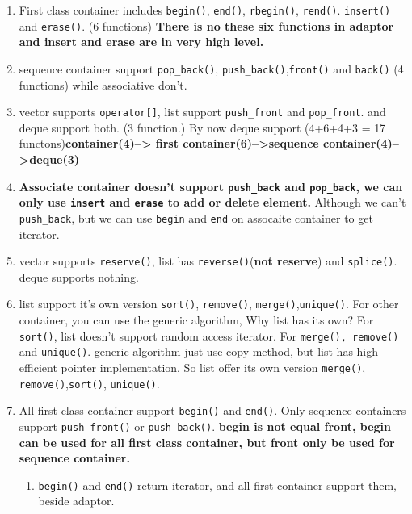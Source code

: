 \documentclass[a4paper,11pt,twoside]{book}
\begin{document}
\begin{itemize}
\begin{enumerate}
\item First class container includes \texttt{begin()}, \texttt{end()}, \texttt{rbegin()}, \texttt{rend()}. \texttt{insert()} and \texttt{erase()}. (6 functions) \textbf{There is no these six functions in adaptor and insert and erase are in very high level.}

\item sequence container support \texttt{pop\_back()}, \texttt{push\_back()},\texttt{front()} and \texttt{back()} (4 functions)
 while associative don't.
 
\item vector supports \texttt{operator[]}, list support \texttt{push\_front} and \texttt{pop\_front}. and deque support both. (3 function.)  By now deque support (4+6+4+3 = 17 functons)\textbf{container(4)--> first container(6)-->sequence container(4)-->deque(3)}

\item \textbf{Associate container doesn't support \texttt{push\_back} and \texttt{pop\_back}, we can only use \texttt{insert} and \texttt{erase} to add or delete element.} Although we can't \texttt{push\_back}, but we can use \texttt{begin} and \texttt{end} on assocaite container to get iterator.

\item vector supports \texttt{reserve()}, list has \texttt{reverse()}(\textbf{not reserve}) and \texttt{splice()}.  deque supports nothing.

\item list support it's own  version \texttt{sort()}, \texttt{remove()}, \texttt{merge()},\texttt{unique()}. For other container, you can use the generic algorithm, Why list has its own? For \texttt{sort()}, list doesn't support random access iterator. For \texttt{merge(), remove()} and \texttt{unique()}. generic algorithm just use copy method, but list has high efficient pointer implementation, So list offer its own version \texttt{merge()}, \texttt{remove()},\texttt{sort()}, \texttt{unique()}.

\item All first class container support \texttt{begin()} and \texttt{end()}. Only sequence containers support \texttt{push\_front()} or \texttt{push\_back()}. \textbf{begin is not equal front, begin can be used for all first class container, but front only be used for sequence container.}

\begin{enumerate}
\item \texttt{begin()} and \texttt{end()} return iterator, and all first container support them, beside adaptor.


\end{enumerate}
\end{enumerate}
\end{itemize}
\end{document}
